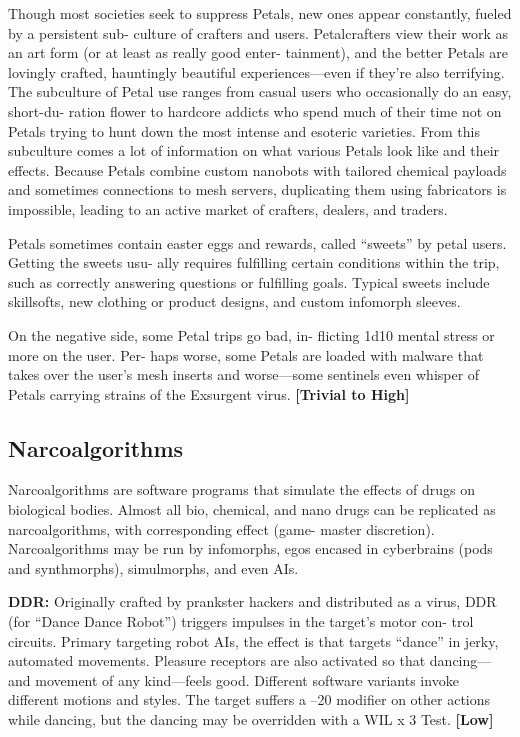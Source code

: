 Though most societies seek to suppress Petals, new 
ones appear constantly, fueled by a persistent sub-
culture of crafters and users. Petalcrafters view their 
work as an art form (or at least as really good enter-
tainment), and the better Petals are lovingly crafted, 
hauntingly beautiful experiences—even if they're also 
terrifying. The subculture of Petal use ranges from 
casual users who occasionally do an easy, short-du-
ration flower to hardcore addicts who spend much of 
their time not on Petals trying to hunt down the most 
intense and esoteric varieties. From this subculture 
comes a lot of information on what various Petals 
look like and their effects. Because Petals combine 
custom nanobots with tailored chemical payloads and 
sometimes connections to mesh servers, duplicating 
them using fabricators is impossible, leading to an 
active market of crafters, dealers, and traders.

Petals sometimes contain easter eggs and rewards, 
called ``sweets'' by petal users. Getting the sweets usu-
ally requires fulfilling certain conditions within the 
trip, such as correctly answering questions or fulfilling 
goals. Typical sweets include skillsofts, new clothing 
or product designs, and custom infomorph sleeves.

On the negative side, some Petal trips go bad, in-
flicting 1d10 mental stress or more on the user. Per-
haps worse, some Petals are loaded with malware that 
takes over the user's mesh inserts and worse—some 
sentinels even whisper of Petals carrying strains of the 
Exsurgent virus. \textbf{[Trivial to High]}

\subsection{Narcoalgorithms}

Narcoalgorithms are software programs that simulate 
the effects of drugs on biological bodies. Almost all 
bio, chemical, and nano drugs can be replicated as 
narcoalgorithms, with corresponding effect (game-
master discretion). Narcoalgorithms may be run by 
infomorphs, egos encased in cyberbrains (pods and 
synthmorphs), simulmorphs, and even AIs.

\textbf{DDR:} Originally crafted by prankster hackers 
and distributed as a virus, DDR (for ``Dance Dance 
Robot'') triggers impulses in the target's motor con-
trol circuits. Primary targeting robot AIs, the effect is 
that targets ``dance'' in jerky, automated movements. 
Pleasure receptors are also activated so that dancing—
and movement of any kind—feels good. Different 
software variants invoke different motions and styles. 
The target suffers a –20 modifier on other actions 
while dancing, but the dancing may be overridden 
with a WIL x 3 Test. \textbf{[Low]}

